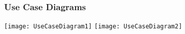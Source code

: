 \subsubsection{Use Case Diagrams}

\texttt{[image: UseCaseDiagram1]}
\vspace*{3cm}
\texttt{[image: UseCaseDiagram2]}